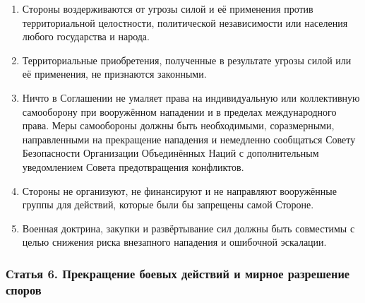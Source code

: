 \documentclass[
  russian,
  11pt,
  a4paper,
]{article}
\providecommand{\tightlist}{%
  \setlength{\itemsep}{0pt}\setlength{\parskip}{0pt}}
\begin{document}
\begin{enumerate}
\def\labelenumi{\arabic{enumi}.}
\tightlist
\item
  Стороны воздерживаются от угрозы силой и её применения против
  территориальной целостности, политической независимости или населения
  любого государства и народа.
\item
  Территориальные приобретения, полученные в результате угрозы силой или
  её применения, не признаются законными.
\item
  Ничто в Соглашении не умаляет права на индивидуальную или коллективную
  самооборону при вооружённом нападении и в пределах международного
  права. Меры самообороны должны быть необходимыми, соразмерными,
  направленными на прекращение нападения и немедленно сообщаться Совету
  Безопасности Организации Объединённых Наций с дополнительным
  уведомлением Совета предотвращения конфликтов.
\item
  Стороны не организуют, не финансируют и не направляют вооружённые
  группы для действий, которые были бы запрещены самой Стороне.
\item
  Военная доктрина, закупки и развёртывание сил должны быть совместимы с
  целью снижения риска внезапного нападения и ошибочной эскалации.
\end{enumerate}

\subsubsection{Статья 6. Прекращение боевых действий и мирное разрешение
споров}\label{ux441ux442ux430ux442ux44cux44f-6-ux43fux440ux435ux43aux440ux430ux449ux435ux43dux438ux435-ux431ux43eux435ux432ux44bux445-ux434ux435ux439ux441ux442ux432ux438ux439-ux438-ux43cux438ux440ux43dux43eux435-ux440ux430ux437ux440ux435ux448ux435ux43dux438ux435-ux441ux43fux43eux440ux43eux432}
\end{document}
